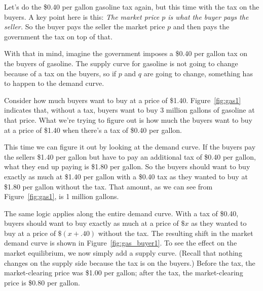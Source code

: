 Let's do the \$0.40 per gallon gasoline tax again, but this time with the tax on the buyers. A key point here is this: \emph{The market price $p$ is what the buyer pays the seller.} So the buyer pays the seller the market price $p$ and then pays the government the tax on top of that.

With that in mind, imagine the government imposes a \$0.40 per gallon tax on the buyers of gasoline. The supply curve for gasoline is not going to change because of a tax on the buyers, so if $p$ and $q$ are going to change, something has to happen to the demand curve.

Consider how much buyers want to buy at a price of \$1.40. Figure~\ref{fig:gas1} indicates that, without a tax, buyers want to buy 3 million gallons of gasoline at that price. What we're trying to figure out is how much the buyers want to buy at a price of \$1.40 when there's a tax of \$0.40 per gallon.

This time we can figure it out by looking at the demand curve. If the buyers pay the sellers \$1.40 per gallon but have to pay an additional tax of \$0.40 per gallon, what they end up paying is \$1.80 per gallon. So the buyers should want to buy exactly as much at \$1.40 per gallon with a \$0.40 tax as they wanted to buy at \$1.80 per gallon without the tax. That amount, as we can see from Figure~\ref{fig:gas1}, is 1 million gallons.

The same logic applies along the entire demand curve. With a tax of \$0.40, buyers should want to buy exactly as much at a price of $\$x$ as they wanted to buy at a price of $\$(x + .40)$ without the tax. The resulting shift in the market demand curve is shown in Figure~\ref{fig:gas_buyer1}. To see the effect on the market equilibrium, we now simply add a supply curve. (Recall that nothing changes on the supply side because the tax is on the buyers.) Before the tax, the market-clearing price was \$1.00 per gallon; after the tax, the market-clearing price is \$0.80 per gallon.


